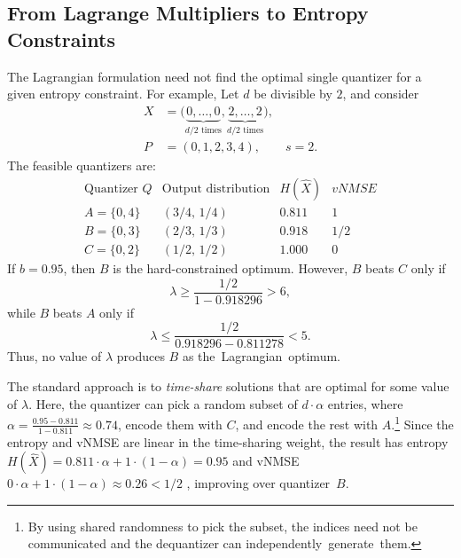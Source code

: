 \documentclass[11pt,letterpaper]{article}
\begin{document}
{\subsection{From Lagrange Multipliers to Entropy Constraints}
\label{app:timesharing-lagrange}
The Lagrangian formulation need not find the optimal single quantizer for a
given entropy constraint. For example, Let $d$ be divisible by $2$, and consider
\[
\begin{aligned}
X&=\bigl(\underbrace{0,\ldots,0}_{d/2\text{ times}},
\underbrace{2,\ldots,2}_{d/2\text{ times}}\bigr),\\
P&=(0,1,2,3,4),\qquad s=2.
\end{aligned}
\]
The feasible quantizers are:
\[
\begin{array}{c|c|c|c}
\text{Quantizer $Q$} & \text{Output distribution} & H(\widehat X) & \mathit{vNMSE}\\
\hline
A=\{0,4\} & (3/4,\,1/4) & 0.811 & 1\\
B=\{0,3\} & (2/3,\,1/3) & 0.918 & 1/2\\
C=\{0,2\} & (1/2,\,1/2) & 1.000 & 0
\end{array}
\]
If $b=0.95$, then $B$ is the hard-constrained optimum. However, $B$ beats
$C$ only if
\[
\lambda \ge \frac{1/2}{1-0.918296}> 6,
\]
while $B$ beats $A$ only if
\[
\lambda \le \frac{1/2}{0.918296-0.811278}< 5.
\]
Thus, no value of $\lambda$ produces $B$ as \mbox{the Lagrangian optimum.}

The standard approach is to \emph{time-share} solutions that are optimal for
some value of $\lambda$. Here, the quantizer can pick a random subset of
$d\cdot\alpha$ entries, where
$\alpha=\frac{0.95-0.811}{1-0.811}\approx0.74$, encode them with $C$, and
encode the rest with $A$.\footnote{By using shared randomness to pick the
subset, the indices need not be communicated and the dequantizer can
\mbox{independently generate them.}} Since the entropy and vNMSE are linear in the
time-sharing weight, the result has entropy
$H(\widehat X)=0.811\cdot\alpha+1\cdot(1-\alpha)=0.95$ and vNMSE
$0\cdot\alpha+1\cdot(1-\alpha)\approx0.26 < 1/2$ , improving over 
\mbox{quantizer $B$.}

}
\end{document}

